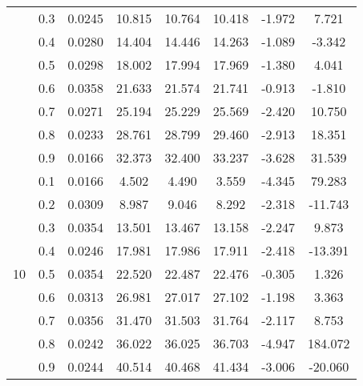 \documentclass[11pt,a4paper]{report}
\begin{document}
\begin{longtable}{ | c | c || c | c | c | c | c | c | }
 & 0.3 & 0.0245 & 10.815 & 10.764 & 10.418 & -1.972 & 7.721 \\
 & 0.4 & 0.0280 & 14.404 & 14.446 & 14.263 & -1.089 & -3.342 \\
 & 0.5 & 0.0298 & 18.002 & 17.994 & 17.969 & -1.380 & 4.041 \\
 & 0.6 & 0.0358 & 21.633 & 21.574 & 21.741 & -0.913 & -1.810 \\
 & 0.7 & 0.0271 & 25.194 & 25.229 & 25.569 & -2.420 & 10.750 \\
 & 0.8 & 0.0233 & 28.761 & 28.799 & 29.460 & -2.913 & 18.351 \\
 & 0.9 & 0.0166 & 32.373 & 32.400 & 33.237 & -3.628 & 31.539 \\
 \hline
\multirow{9}{*}{10} & 0.1 & 0.0166 & 4.502 & 4.490 & 3.559 & -4.345 & 79.283 \\
 & 0.2 & 0.0309 & 8.987 & 9.046 & 8.292 & -2.318 & -11.743 \\
 & 0.3 & 0.0354 & 13.501 & 13.467 & 13.158 & -2.247 & 9.873 \\
 & 0.4 & 0.0246 & 17.981 & 17.986 & 17.911 & -2.418 & -13.391 \\
 & 0.5 & 0.0354 & 22.520 & 22.487 & 22.476 & -0.305 & 1.326 \\
 & 0.6 & 0.0313 & 26.981 & 27.017 & 27.102 & -1.198 & 3.363 \\
 & 0.7 & 0.0356 & 31.470 & 31.503 & 31.764 & -2.117 & 8.753 \\
 & 0.8 & 0.0242 & 36.022 & 36.025 & 36.703 & -4.947 & 184.072 \\
 & 0.9 & 0.0244 & 40.514 & 40.468 & 41.434 & -3.006 & -20.060 \\
 \hline
\hline
\end{longtable}
\end{document}
